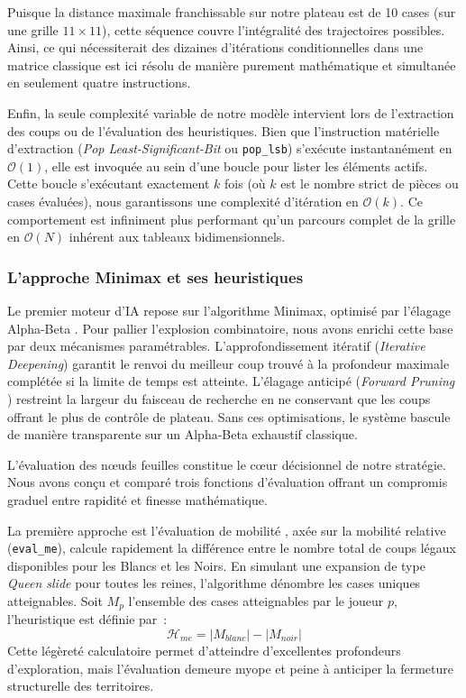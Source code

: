 \documentclass[a4paper]{article}
\begin{document}
Puisque la distance maximale franchissable sur notre plateau est de 10 cases (sur une grille $11 \times 11$), 
cette séquence couvre l'intégralité des trajectoires possibles. Ainsi, ce qui nécessiterait des dizaines
d'itérations conditionnelles dans une matrice classique est ici résolu de manière purement mathématique 
et simultanée en seulement quatre instructions.

Enfin, la seule complexité variable de notre modèle intervient lors de l'extraction des 
coups ou de l'évaluation des heuristiques. Bien que l'instruction matérielle d'extraction 
(\textit{Pop Least-Significant-Bit} ou \texttt{pop\_lsb}) s'exécute instantanément en $\mathcal{O}(1)$, 
elle est invoquée au sein d'une boucle pour lister les éléments actifs. Cette boucle s'exécutant 
exactement $k$ fois (où $k$ est le nombre strict de pièces ou cases évaluées), nous garantissons une 
complexité d'itération en $\mathcal{O}(k)$. Ce comportement est infiniment plus performant qu'un 
parcours complet de la grille en $\mathcal{O}(N)$ inhérent aux tableaux bidimensionnels.

\subsubsection{L'approche Minimax et ses heuristiques}

Le premier moteur d'IA repose sur l'algorithme Minimax, optimisé par
l'élagage Alpha-Beta \cite{GeeksforGeeks2026_AlphaBeta}. Pour pallier l'explosion combinatoire, nous avons
enrichi cette base par deux mécanismes paramétrables. L'approfondissement
itératif (\textit{Iterative Deepening}) garantit le renvoi du meilleur coup
trouvé à la profondeur maximale complétée si la limite de temps est atteinte.
L'élagage anticipé (\textit{Forward Pruning} \cite{Qian2015}) restreint la largeur du
faisceau de recherche en ne conservant que les coups offrant le plus de
contrôle de plateau. Sans ces optimisations, le système bascule de manière transparente
sur un Alpha-Beta exhaustif classique.

L'évaluation des nœuds feuilles constitue le cœur décisionnel de notre
stratégie. Nous avons conçu et comparé trois fonctions d'évaluation offrant
un compromis graduel entre rapidité et finesse mathématique.

La première approche est l'évaluation de mobilité \cite{Hensgens2001}, axée sur la mobilité relative (\texttt{eval\_me}),
calcule rapidement la différence entre le nombre total de coups légaux
disponibles pour les Blancs et les Noirs. En simulant une expansion de type
\textit{Queen slide} pour toutes les reines, l'algorithme dénombre les cases
uniques atteignables. Soit $M_p$ l'ensemble des cases atteignables par le
joueur $p$, l'heuristique est définie par~:
$$ \mathcal{H}_{me} = |M_{blanc}| - |M_{noir}| $$
Cette légèreté calculatoire permet d'atteindre d'excellentes profondeurs
d'exploration, mais l'évaluation demeure myope et peine à anticiper la
fermeture structurelle des territoires.
\end{document}
